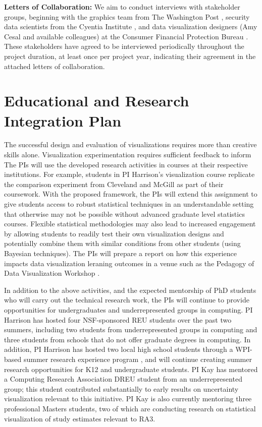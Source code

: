 \documentclass[11pt]{article}
\begin{document}
\noindent\textbf{Letters of Collaboration:} We aim to conduct interviews with stakeholder groups, beginning with the graphics team from The Washington Post \cite{wapo}, security data scientists from the Cyentia Institute \cite{cyentia}, and data visualization designers (\ie Amy Cesal and available colleagues) at the Consumer Financial Protection Bureau \cite{cfpb}.
These stakeholders have agreed to be interviewed periodically throughout the project duration, at least once per project year, indicating their agreement in the attached letters of collaboration.

%
\section{Educational and Research Integration Plan}

The successful design and evaluation of visualizations requires more than creative skills alone.
Visualization experimentation requires sufficient feedback to inform 
The PIs will use the developed research activities in courses at their respective institutions.
For example, students in PI Harrison's visualization course replicate the comparison experiment from Cleveland and McGill as part of their coursework.
With the proposed framework, the PIs will extend this assignment to give students access to robust statistical techniques in an understandable setting that otherwise may not be possible without advanced graduate level statistics courses.
Flexible statistical methodologies may also lead to increased engagement by allowing students to readily test their own visualization designs and potentially combine them with similar conditions from other students (using Bayesian techniques).
The PIs will prepare a report on how this experience impacts data visualization leraning outcomes in a venue such as the Pedagogy of Data Visualization Workshop \cite{pdvw}.

In addition to the above activities, and the expected mentorship of PhD students who will carry out the technical research work, the PIs will continue to provide opportunities for undergraduates and underrepresented groups in computing.
PI Harrison has hosted four NSF-sponsored REU students over the past two summers, including two students from underrepresented groups in computing and three students from schools that do not offer graduate degrees in computing.
In addition, PI Harrison has hosted two local high school students through a WPI-based summer research experience program \cite{wpihs}, and will continue creating summer research opportunities for K12 and undergraduate students.
PI Kay has mentored a Computing Research Association DREU student from an underrepresented group; this student contributed substantially to early results on uncertainty visualization \cite{kay2016bus} relevant to this initiative. 
PI Kay is also currently mentoring three professional Masters students, two of which are conducting research on statistical visualization of study estimates relevant to RA3.
\end{document}
